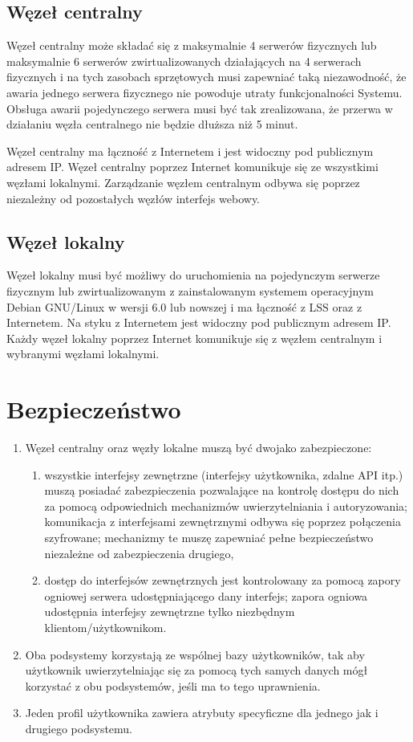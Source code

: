 \documentclass[a4paper]{report}
\begin{document}
\subsection{Węzeł centralny}
Węzeł centralny może składać się z maksymalnie 4 serwerów fizycznych lub maksymalnie 6 serwerów zwirtualizowanych działających na 4 serwerach fizycznych i na tych zasobach sprzętowych musi zapewniać taką niezawodność, że awaria jednego serwera fizycznego nie powoduje utraty funkcjonalności Systemu. Obsługa awarii pojedynczego serwera musi być tak zrealizowana, że przerwa w działaniu węzła centralnego nie będzie dłuższa niż 5 minut.

Węzeł centralny ma łączność z Internetem i jest widoczny pod publicznym adresem IP. Węzeł centralny poprzez Internet komunikuje się ze wszystkimi węzłami lokalnymi. Zarządzanie węzłem centralnym odbywa się poprzez niezależny od pozostałych węzłów interfejs webowy.

\subsection{Węzeł lokalny}
Węzeł lokalny musi być możliwy do uruchomienia na pojedynczym serwerze fizycznym lub zwirtualizowanym z zainstalowanym systemem operacyjnym Debian GNU/Linux w wersji 6.0 lub nowszej i ma łączność z LSS oraz z Internetem. Na styku z Internetem jest widoczny pod publicznym adresem IP. Każdy węzeł lokalny poprzez Internet komunikuje się z węzłem centralnym i wybranymi węzłami lokalnymi.

\section{Bezpieczeństwo}
\begin{enumerate}
 \item Węzeł centralny oraz węzły lokalne muszą być dwojako zabezpieczone:
    \begin{enumerate}
    \item wszystkie interfejsy zewnętrzne (interfejsy użytkownika, zdalne API itp.) muszą posiadać zabezpieczenia
    pozwalające na kontrolę dostępu do nich za pomocą odpowiednich mechanizmów uwierzytelniania i autoryzowania;
    komunikacja z interfejsami zewnętrznymi odbywa się poprzez połączenia szyfrowane; mechanizmy te muszę zapewniać pełne bezpieczeństwo niezależne od zabezpieczenia drugiego,
    \item dostęp do interfejsów zewnętrznych jest kontrolowany za pomocą zapory ogniowej serwera udostępniającego
    dany interfejs; zapora ogniowa udostępnia interfejsy zewnętrzne tylko niezbędnym klientom/użytkownikom.
    \end{enumerate}
 \item Oba podsystemy korzystają ze wspólnej bazy użytkowników, tak aby użytkownik uwierzytelniając się za pomocą tych samych danych mógł korzystać z obu podsystemów, jeśli ma to tego uprawnienia.
 \item Jeden profil użytkownika zawiera atrybuty specyficzne dla jednego jak i drugiego podsystemu.
\end{enumerate}
\end{document}
